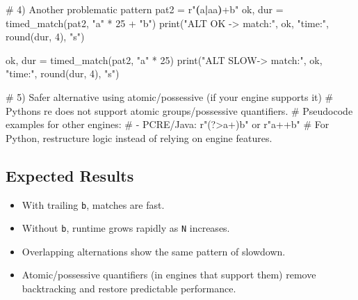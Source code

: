\documentclass[
  letterpaper,
  DIV=11,
  numbers=noendperiod]{scrreprt}
\newenvironment{Shaded}{\begin{snugshade}}{\end{snugshade}}
\newcommand{\BuiltInTok}[1]{\textcolor[rgb]{0.00,0.23,0.31}{#1}}
\newcommand{\CommentTok}[1]{\textcolor[rgb]{0.37,0.37,0.37}{#1}}
\newcommand{\ControlFlowTok}[1]{\textcolor[rgb]{0.00,0.23,0.31}{\textbf{#1}}}
\newcommand{\DecValTok}[1]{\textcolor[rgb]{0.68,0.00,0.00}{#1}}
\newcommand{\KeywordTok}[1]{\textcolor[rgb]{0.00,0.23,0.31}{\textbf{#1}}}
\newcommand{\NormalTok}[1]{\textcolor[rgb]{0.00,0.23,0.31}{#1}}
\newcommand{\OperatorTok}[1]{\textcolor[rgb]{0.37,0.37,0.37}{#1}}
\newcommand{\StringTok}[1]{\textcolor[rgb]{0.13,0.47,0.30}{#1}}
\newcommand{\VerbatimStringTok}[1]{\textcolor[rgb]{0.13,0.47,0.30}{#1}}
\providecommand{\tightlist}{%
  \setlength{\itemsep}{0pt}\setlength{\parskip}{0pt}}
\begin{document}
\begin{Shaded}
\begin{Highlighting}[]
\CommentTok{\# 4) Another problematic pattern}
\NormalTok{pat2 }\OperatorTok{=} \VerbatimStringTok{r"}\KeywordTok{(}\VerbatimStringTok{a}\ControlFlowTok{|}\VerbatimStringTok{aa}\KeywordTok{)}\OperatorTok{+}\VerbatimStringTok{b"}
\NormalTok{ok, dur }\OperatorTok{=}\NormalTok{ timed\_match(pat2, }\StringTok{"a"} \OperatorTok{*} \DecValTok{25} \OperatorTok{+} \StringTok{"b"}\NormalTok{)}
\BuiltInTok{print}\NormalTok{(}\StringTok{"ALT OK {-}\textgreater{} match:"}\NormalTok{, ok, }\StringTok{"time:"}\NormalTok{, }\BuiltInTok{round}\NormalTok{(dur, }\DecValTok{4}\NormalTok{), }\StringTok{"s"}\NormalTok{)}

\NormalTok{ok, dur }\OperatorTok{=}\NormalTok{ timed\_match(pat2, }\StringTok{"a"} \OperatorTok{*} \DecValTok{25}\NormalTok{)}
\BuiltInTok{print}\NormalTok{(}\StringTok{"ALT SLOW{-}\textgreater{} match:"}\NormalTok{, ok, }\StringTok{"time:"}\NormalTok{, }\BuiltInTok{round}\NormalTok{(dur, }\DecValTok{4}\NormalTok{), }\StringTok{"s"}\NormalTok{)}

\CommentTok{\# 5) Safer alternative using atomic/possessive (if your engine supports it)}
\CommentTok{\# Python\textquotesingle{}s \textquotesingle{}re\textquotesingle{} does not support atomic groups/possessive quantifiers.}
\CommentTok{\# Pseudocode examples for other engines:}
\CommentTok{\#   {-} PCRE/Java: r"(?\textgreater{}a+)b" or r"a++b"}
\CommentTok{\# For Python, restructure logic instead of relying on engine features.}
\end{Highlighting}
\end{Shaded}

\subsection{Expected Results}\label{expected-results-10}

\begin{itemize}
\tightlist
\item
  With trailing \texttt{b}, matches are fast.
\item
  Without \texttt{b}, runtime grows rapidly as \texttt{N} increases.
\item
  Overlapping alternations show the same pattern of slowdown.
\item
  Atomic/possessive quantifiers (in engines that support them) remove
  backtracking and restore predictable performance.
\end{itemize}
\end{document}
